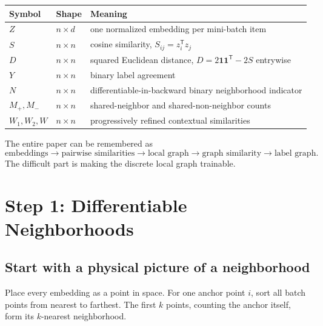 \documentclass[11pt,oneside,openany]{book}
\theoremstyle{myplain}
\theoremstyle{definition}
\newcommand{\transpose}{\mathsf{T}}
\begin{document}
\begin{center}
\begin{tabularx}{\textwidth}{>{\bfseries}l l X}
\toprule
Symbol & Shape & Meaning \\
\midrule
$Z$ & $n\times d$ & one normalized embedding per mini-batch item \\
$S$ & $n\times n$ & cosine similarity, $S_{ij}=z_i^\transpose z_j$ \\
$D$ & $n\times n$ & squared Euclidean distance, $D=2\mathbf 1\mathbf 1^\transpose-2S$ entrywise \\
$Y$ & $n\times n$ & binary label agreement \\
$N$ & $n\times n$ & differentiable-in-backward binary neighborhood indicator \\
$M_+,M_-$ & $n\times n$ & shared-neighbor and shared-non-neighbor counts \\
$W_1,W_2,W$ & $n\times n$ & progressively refined contextual similarities \\
\bottomrule
\end{tabularx}
\end{center}

\begin{conceptbox}[title=The conceptual compression]
The entire paper can be remembered as
\[
\boxed{\text{embeddings}\to\text{pairwise similarities}\to\text{local graph}\to\text{graph similarity}\to\text{label graph}.}
\]
The difficult part is making the discrete local graph trainable.
\end{conceptbox}

\chapter{Step 1: Differentiable Neighborhoods}
\label{chap:step1}

\section{Start with a physical picture of a neighborhood}

Place every embedding as a point in space. For one anchor point $i$, sort all batch points from nearest to farthest. The first $k$ points, counting the anchor itself, form its $k$-nearest neighborhood.
\end{document}

